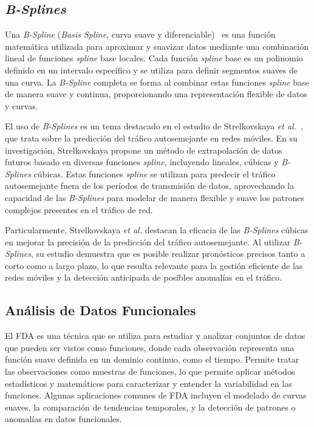 \subsection{\textit{B-Splines}} %
Una \textit{B-Spline} (\textit{Basis Spline}, curva suave y diferenciable)~\cite{prautzsch2002bezier} es una función matemática utilizada para aproximar y suavizar datos mediante una combinación lineal de funciones \textit{spline} base locales. Cada función \textit{spline} base es un polinomio definido en un intervalo específico y se utiliza para definir segmentos suaves de una curva. La \textit{B-Spline} completa se forma al combinar estas funciones \textit{spline} base de manera suave y continua, proporcionando una representación flexible de datos y curvas.

El uso de \textit{B-Splines} es un tema destacado en el estudio de Strelkovskaya \textit{et al.}~\cite{strelkovskaya2019}, que trata sobre la predicción del tráfico autosemejante en redes móviles.
En su investigación, Strelkovskaya propone un método de extrapolación de datos futuros basado en diversas funciones \textit{spline}, incluyendo lineales, cúbicas y \textit{B-Splines} cúbicas. Estas funciones \textit{spline} se utilizan para predecir el tráfico autosemejante fuera de los períodos de transmisión de datos, aprovechando la capacidad de las \textit{B-Splines} para modelar de manera flexible y suave los patrones complejos presentes en el tráfico de red.

Particularmente, Strelkovskaya \textit{et al.} destacan la eficacia de las \textit{B-Splines} cúbicas en mejorar la precisión de la predicción del tráfico autosemejante. Al utilizar \textit{B-Splines}, su estudio demuestra que es posible realizar pronósticos precisos tanto a corto como a largo plazo, lo que resulta relevante para la gestión eficiente de las redes móviles y la detección anticipada de posibles anomalías en el tráfico.

\subsection{Análisis de Datos Funcionales} %
El \ac{FDA} es una técnica que se utiliza para estudiar y analizar conjuntos de datos que pueden ser vistos como funciones, donde cada observación representa una función suave definida en un dominio continuo, como el tiempo.
Permite tratar las observaciones como muestras de funciones, lo que permite aplicar métodos estadísticos y matemáticos para caracterizar y entender la variabilidad en las funciones. Algunas aplicaciones comunes de FDA incluyen el modelado de curvas suaves, la comparación de tendencias temporales, y la detección de patrones o anomalías en datos funcionales.

